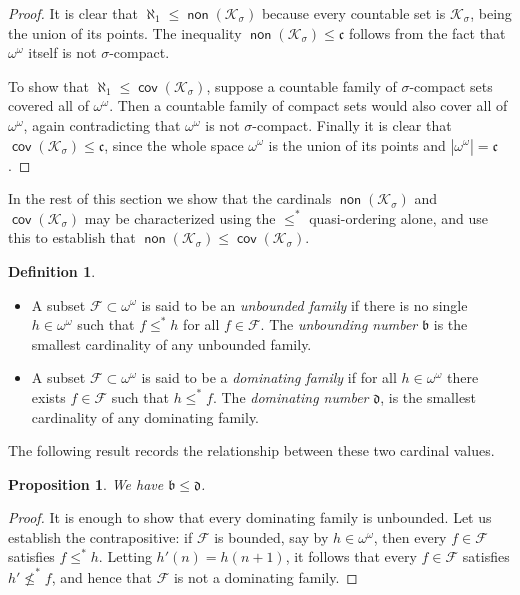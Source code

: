 \documentclass[11pt,oneside]{amsbook}
\newcommand{\Ksigma}{\mathcal K_\sigma}
\DeclareMathOperator{\non}{\mathsf{non}}
\DeclareMathOperator{\cov}{\mathsf{cov}}
\theoremstyle{definition}
\theoremstyle{plain}
\newtheorem{proposition}[theorem]{Proposition}
\theoremstyle{definition}
\newtheorem{definition}[theorem]{Definition}
\theoremstyle{remark}
\numberwithin{equation}{section}
\numberwithin{figure}{section}
\begin{document}
\begin{proof}
  It is clear that $\aleph_1\leq\non(\Ksigma)$ because every countable set is $\Ksigma$, being the union of its points. The inequality $\non(\Ksigma)\leq\mathfrak c$ follows from the fact that $\omega^\omega$ itself is not $\sigma$-compact.

  To show that $\aleph_1\leq\cov(\Ksigma)$, suppose a countable family of $\sigma$-compact sets covered all of $\omega^\omega$. Then a countable family of compact sets would also cover all of $\omega^\omega$, again contradicting that $\omega^\omega$ is not $\sigma$-compact. Finally it is clear that $\cov(\Ksigma)\leq\mathfrak c$, since the whole space $\omega^\omega$ is the union of its points and $|\omega^\omega|=\mathfrak c$.
\end{proof}

In the rest of this section we show that the cardinals $\non(\Ksigma)$ and $\cov(\Ksigma)$ may be characterized using the $\leq^*$ quasi-ordering alone, and use this to establish that $\non(\Ksigma)\leq\cov(\Ksigma)$.

\begin{definition}
  \begin{itemize}
  \item A subset $\mathcal F\subset\omega^\omega$ is said to be an \emph{unbounded family} if there is no single $h\in\omega^\omega$ such that $f\leq^*h$ for all $f\in\mathcal F$. The \emph{unbounding number} $\mathfrak b$ is the smallest cardinality of any unbounded family.
  \item A subset $\mathcal F\subset\omega^\omega$ is said to be a \emph{dominating family} if for all $h\in\omega^\omega$ there exists $f\in\mathcal F$ such that $h\leq^*f$. The \emph{dominating number} $\mathfrak d$, is the smallest cardinality of any dominating family.
  \end{itemize}
\end{definition}

The following result records the relationship between these two cardinal values.

\begin{proposition}
  \label{prop:bd}
  We have $\mathfrak{b}\leq\mathfrak{d}$.
\end{proposition}

\begin{proof}
  It is enough to show that every dominating family is unbounded. Let us establish the contrapositive: if $\mathcal F$ is bounded, say by $h\in\omega^\omega$, then every $f\in\mathcal F$ satisfies $f\leq^*h$. Letting $h'(n)=h(n+1)$, it follows that every $f\in\mathcal F$ satisfies $h'\not\leq^*f$, and hence that $\mathcal F$ is not a dominating family.
\end{proof}
\end{document}
